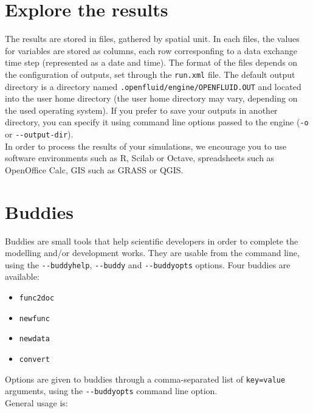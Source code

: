 \section{Explore the results}

The results are stored in files, gathered by spatial unit. In each files, the values for variables are stored as columns, each row corresponfing to a data exchange time step (represented as a date and time).
The format of the files depends on the configuration of outputs, set through the \texttt{run.xml} file.
The default output directory is a directory named \texttt{.openfluid/engine/OPENFLUID.OUT} and located into the user home directory (the user home directory may vary, depending on the used operating system).
If you prefer to save your outputs in another directory, you can specify it using command line options passed to the engine (\texttt{-o} or \verb?--?\texttt{output-dir}).\\

\noindent In order to process the results of your simulations, we encourage you to use software environments such as R, Scilab or Octave, spreadsheets such as OpenOffice Calc, GIS such as GRASS or QGIS.   

\section{Buddies}

Buddies are small tools that help scientific developers in order to complete the modelling and/or development works. They are usable from the command line, using the \verb?--?\texttt{buddyhelp}, \verb?--?\texttt{buddy} and \verb?--?\texttt{buddyopts} options. Four buddies are available:
\begin{itemize}
  \item \texttt{func2doc}  
  \item \texttt{newfunc}
  \item \texttt{newdata}
  \item \texttt{convert}
\end{itemize}

\noindent Options are given to buddies through a comma-separated list of \texttt{key=value} arguments, using the \verb?--?\texttt{buddyopts} command line option.\\

\noindent General usage is:\\


